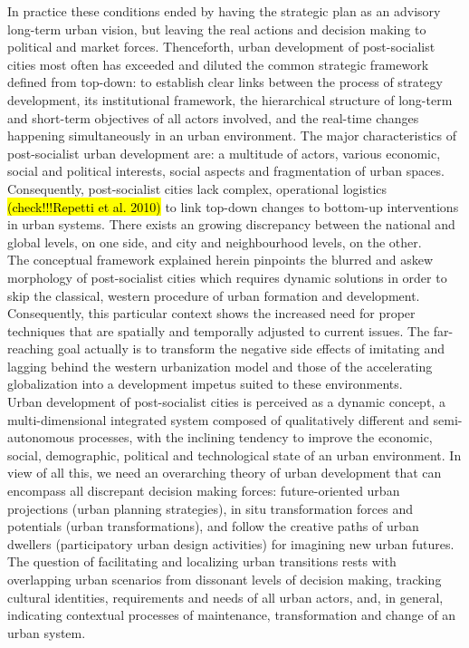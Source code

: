 \documentclass[11pt]{report}
\begin{document}
In practice these conditions ended by having the strategic plan as an advisory long-term urban vision, but leaving the real actions and decision making to political and market forces. Thenceforth, urban development of post-socialist cities most often has exceeded and diluted the common strategic framework defined from top-down: to establish clear links between the process of strategy development, its institutional framework, the hierarchical structure of long-term and short-term objectives of all actors involved, and the real-time changes happening simultaneously in an urban environment. The major characteristics of post-socialist urban development are: a multitude of actors, various economic, social and political interests, social aspects and fragmentation of urban spaces. Consequently, post-socialist cities lack complex, operational logistics \hl{(check!!!Repetti et al. 2010)} to link top-down changes to bottom-up interventions in urban systems. There exists an growing discrepancy between the national and global levels, on one side, and city and neighbourhood levels, on the other. 
\\
The  conceptual  framework  explained  herein  pinpoints  the  blurred  and  askew  morphology of  post-socialist  cities which  requires  dynamic  solutions  in  order  to  skip  the  classical, western procedure  of  urban  formation  and development. Consequently, this particular context shows the increased need for proper techniques that are spatially and temporally adjusted to current issues. The far-reaching goal actually is to transform the negative side effects of imitating and lagging behind the western urbanization model and those of the accelerating globalization into a development impetus suited to these environments.
\\
Urban development of post-socialist cities is perceived as a dynamic concept, a multi-dimensional integrated system composed of qualitatively different and semi-autonomous processes, with the inclining tendency to improve the economic, social, demographic, political and technological state of an urban environment. In view of all this, we need an overarching theory of urban development that can encompass all discrepant decision making forces: future-oriented urban projections (urban planning strategies), in situ transformation forces and potentials (urban transformations), and follow the creative paths of urban dwellers (participatory urban design activities) for imagining new urban futures. The question of facilitating and localizing urban transitions rests with overlapping urban scenarios from dissonant levels of decision making, tracking cultural identities, requirements and needs of all urban actors, and, in general, indicating contextual processes of maintenance, transformation and change of an urban system. 
\end{document}
